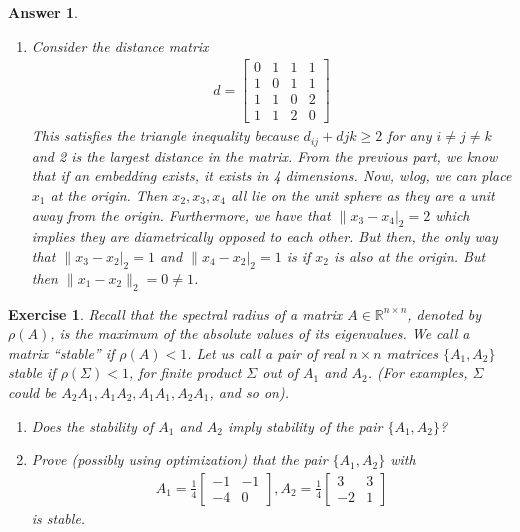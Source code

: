 \documentclass[12pt]{article}
\theoremstyle{colon}
\newtheorem{exercise}{Exercise}
\newtheorem*{answer}{Answer}
\begin{document}
\begin{answer}
\begin{enumerate}[label=\arabic*)]
    \item Consider the distance matrix
      \begin{gather*}
        d = \begin{bmatrix}
          0 & 1 & 1 & 1 \\
          1 & 0 & 1 & 1 \\
          1 & 1 & 0 & 2 \\
          1 & 1 & 2 & 0
        \end{bmatrix}
      \end{gather*}
      This satisfies the triangle inequality because $d_{ij} + d{jk} \geq 2$ for any $i \neq j \neq k$ and 2 is the largest distance in the matrix. From the previous part, we know that if an embedding exists, it exists in 4 dimensions. Now, wlog, we can place $x_1$ at the origin. Then $x_2, x_3, x_4$ all lie on the unit sphere as they are a unit away from the origin. Furthermore, we have that $\lVert x_3 - x_4 \rvert_2 = 2$ which implies they are diametrically opposed to each other. But then, the only way that $\lVert x_3 - x_2 \rvert_2 = 1$ and $\lVert x_4 - x_2 \rvert_2 = 1$ is if $x_2$ is also at the origin. But then $\lVert x_1 - x_2 \rVert_2 = 0 \neq 1$.
  \end{enumerate}
\end{answer}

\clearpage

\begin{exercise}
  Recall that the spectral radius of a matrix $A \in \mathbb{R}^{n \times n}$, denoted by $\rho(A)$, is the maximum of the absolute values of its eigenvalues. We call a matrix ``stable'' if $\rho(A) < 1$. Let us call a pair of real $n \times n$ matrices $\{ A_1, A_2 \}$ stable if $\rho(\Sigma) < 1$, for finite product $\Sigma$ out of $A_1$ and $A_2$. (For examples, $\Sigma$ could be $A_2 A_1, A_1 A_2, A_1 A_1,A_2A_1$, and so on).
  \begin{enumerate}[label=\arabic*)]
    \item Does the stability of $A_1$ and $A_2$ imply stability of the pair $\{A_1, A_2\}$?
    \item Prove (possibly using optimization) that the pair $\{A_1, A_2\}$ with
      \begin{gather*}
        A_1 = \frac{1}{4} \begin{bmatrix}
          -1 & -1 \\
          -4 & 0
        \end{bmatrix}, A_2 = \frac{1}{4} \begin{bmatrix}
          3 & 3 \\
          -2 & 1
        \end{bmatrix}
      \end{gather*}
      is stable.
  \end{enumerate}
\end{exercise}
\end{document}
